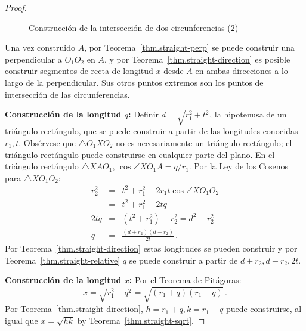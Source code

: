 \begin{proof}
\begin{figure}[b]
\begin{center}
\end{center}
\caption{Construcción de la intersección de dos circunferencias (2)}\label{f.se-circle-circle2}
\end{figure}

Una vez construido $A$, por Teorema~\ref{thm.straight-perp} se puede construir una perpendicular a $\overline{O_1O_2}$ en $A$, y por Teorema~\ref{thm.straight-direction} es posible construir segmentos de recta de longitud $x$ desde $A$ en ambas direcciones a lo largo de la perpendicular. Sus otros puntos extremos son los puntos de intersección de las circunferencias.

\noindent\textbf{Construcción de la longitud $q$:} Definir $d=\sqrt{r_1^2+t^2}$, la hipotenusa de un triángulo rectángulo, que se puede construir a partir de las longitudes conocidas $r_1,t$. Obsérvese que $\triangle O_1XO_2$ no es necesariamente un triángulo rectángulo; el triángulo rectángulo puede construirse en cualquier parte del plano. En el triángulo rectángulo $\triangle XAO_1$, $\cos\angle XO_1A=q/r_1$. Por la Ley de los Cosenos para $\triangle XO_1O_2$:
\begin{eqnarray*}
r_2^2 &=& t^2 + r_1^2 - 2r_1t\cos\angle XO_1O_2\\
&=& t^2 + r_1^2 - 2tq\\
2tq &=& (t^2+r_1^2) - r_2^2=d^2-r_2^2\\
q&=&\frac{(d+r_2)(d-r_2)}{2t}\,.
\end{eqnarray*}
Por Teorema~\ref{thm.straight-direction} estas longitudes se pueden construir y por Teorema~\ref{thm.straight-relative} $q$ se puede construir a partir de $d+r_2,d-r_2,2t$.

\noindent\textbf{Construcción de la longitud $x$:} Por el Teorema de Pitágoras:
\[
x=\sqrt{r_1^2-q^2}=\sqrt{(r_1+q)(r_1-q)}\,.
\]
Por Teorema~\ref{thm.straight-direction}, $h =r_1+ q,k= r_1 - q$ puede construirse, al igual que $x=\sqrt{hk}$ by Teorema~\ref{thm.straight-sqrt}.
\end{proof}

